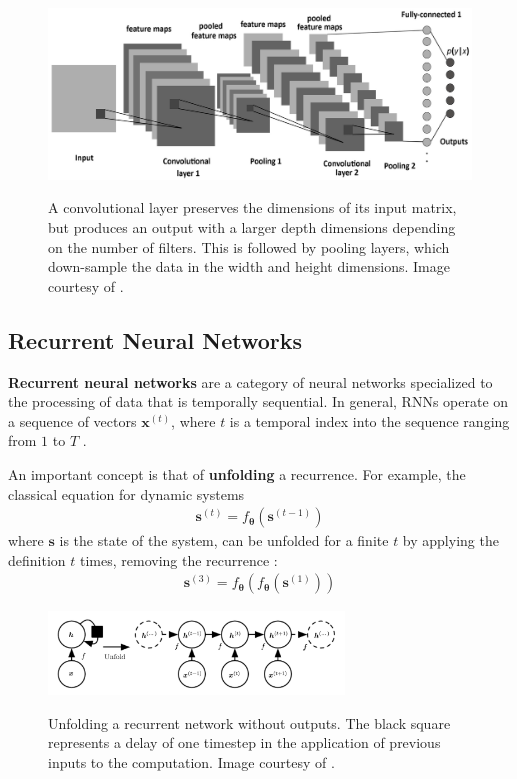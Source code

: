 \documentclass[12pt, titlepage]{report}
\theoremstyle{definition}
\begin{document}
\begin{figure}
\centering
\includegraphics[width=1\textwidth]{img/conv_pooling.png}\\
\caption{A convolutional layer preserves the dimensions of its input matrix, but produces an output with a larger depth dimensions depending on the number of filters. This is followed by pooling layers, which down-sample the data in the width and height dimensions. Image courtesy of  \cite{albelwi2017framework}.}
\label{figure:conv_pooling}
\end{figure}


\subsection{Recurrent Neural Networks}
\textbf{Recurrent neural networks} are a category of neural networks specialized to the processing of data that is temporally sequential. In general, RNNs operate on a sequence of vectors $\bm{x}^{(t)}$, where $t$ is a temporal index into the sequence ranging from $1$ to $T$ \cite[p. 368]{goodfellow2016deep}.

An important concept is that of \textbf{unfolding} a recurrence. For example, the classical equation for dynamic systems
\begin{gather}\label{eq:dynamic_system}
\bm{s}^{(t)} = f_{\bm{\theta}}(\bm{s}^{(t - 1)})
\end{gather}
where $\bm{s}$ is the state of the system, can be unfolded for a finite $t$ by applying the definition $t$ times, removing the recurrence \cite[p. 369-370]{goodfellow2016deep}:
\begin{gather}\label{eq:dynamic_system}
\bm{s}^{(3)} = f_{\bm{\theta}}(f_{\bm{\theta}}(\bm{s}^{(1)}))
\end{gather}

\begin{figure}
\centering
\includegraphics[width=0.7\textwidth]{img/unfolding.png}\\
\caption{Unfolding a recurrent network without outputs. The black square represents a delay of one timestep in the application of previous inputs to the computation. Image courtesy of  \cite[p. 370]{goodfellow2016deep}.}
\label{figure:conv_pooling}
\end{figure}
\end{document}
